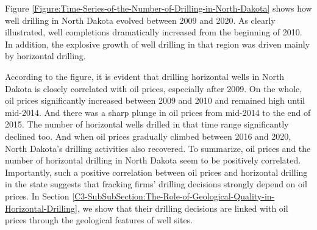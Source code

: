 Figure \ref{Figure:Time-Series-of-the-Number-of-Drilling-in-North-Dakota} shows how well drilling in North Dakota evolved between 2009 and 2020. As clearly illustrated, well completions dramatically increased from the beginning of 2010. In addition, the explosive growth of well drilling in that region was driven mainly by horizontal drilling. 

According to the figure, it is evident that drilling horizontal wells in North Dakota is closely correlated with oil prices, especially after 2009. On the whole, oil prices significantly increased between 2009 and 2010 and remained high until mid-2014. And there was a sharp plunge in oil prices from mid-2014 to the end of 2015. The number of horizontal wells drilled in that time range significantly declined too. And when oil prices gradually climbed between 2016 and 2020, North Dakota's drilling activities also recovered. To summarize, oil prices and the number of horizontal drilling in North Dakota seem to be positively correlated. Importantly, such a positive correlation between oil prices and horizontal drilling in the state suggests that fracking firms' drilling decisions strongly depend on oil prices. In Section \ref{C3-SubSubSection:The-Role-of-Geological-Quality-in-Horizontal-Drilling}, we show that their drilling decisions are linked with oil prices through the geological features of well sites.
